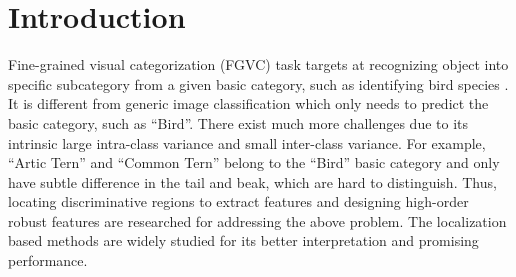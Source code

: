 \documentclass[sigconf, nonacm]{acmart}
\begin{document}










\maketitle

\section{Introduction}




Fine-grained visual categorization (FGVC) task \cite{wei2021fine} targets at recognizing object into specific subcategory from a given basic category, such as identifying bird species \cite{cub200}. It is different from generic image classification which only needs to predict the basic category, such as “Bird”. There exist much more challenges due to its intrinsic large intra-class variance and small inter-class variance. For example, “Artic Tern” and “Common Tern” belong to the “Bird” basic category and only have subtle difference in the tail and beak, which are hard to distinguish. Thus, locating discriminative regions to extract features and designing high-order robust features are researched for addressing the above problem. The localization based methods are widely studied for its better interpretation and promising performance.
\end{document}
